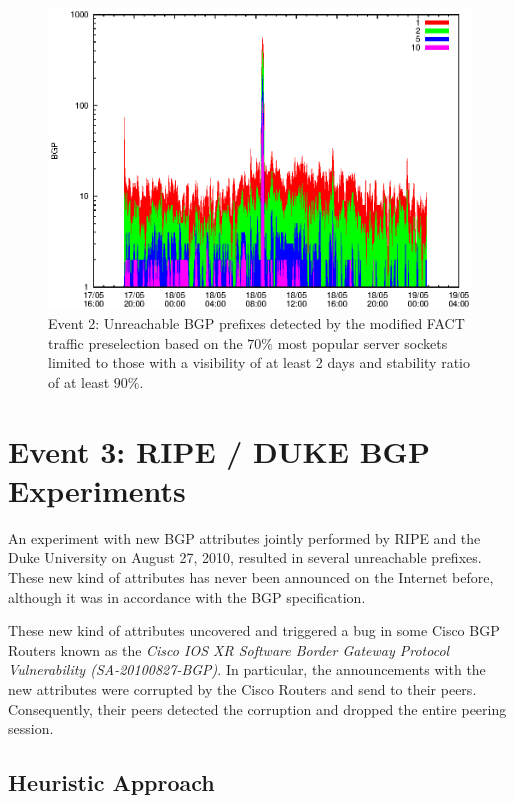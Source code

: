 \begin{figure}
	[p] \centering 
	\includegraphics[width=0.75\linewidth]{images/events/2010_05_18/bgp_log_Set_var_0_1_stab_9_vts_2.eps}
	\caption{Event 2: Unreachable BGP prefixes detected by the modified FACT traffic preselection based on the $70\%$ most popular server sockets limited to those with a visibility of at least 2 days and stability ratio of at least $90\%$.} 
	\label{fig:TIER1_FACT_popularVTS2STAB9} 
\end{figure}

\newpage
\section{Event 3: RIPE / DUKE BGP Experiments}

An experiment with new BGP attributes jointly performed by RIPE and the Duke 
University on August 27, 2010, resulted in several unreachable 
prefixes\citep{SchatzmannPAM2011}. These 
new kind of attributes has never been announced on the Internet before,  
although it was in accordance with the BGP specification\citep{ripe_duke}.

These new kind of attributes uncovered and triggered a bug in some Cisco BGP 
Routers known as the \emph{Cisco IOS XR Software Border Gateway Protocol 
Vulnerability (SA-20100827-BGP)}\citep{cisco_vulnerability}. In particular, the 
announcements with the new attributes were corrupted 
by the Cisco Routers and send to their peers. Consequently, their peers detected 
the corruption and dropped the entire peering session\citep{ripe_duke}.

\subsection{Heuristic Approach}

